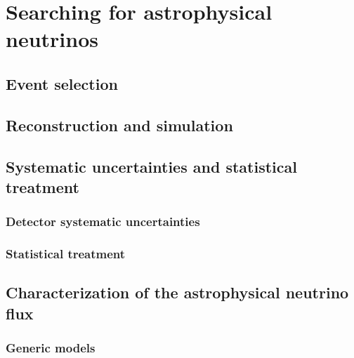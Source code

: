 \chapter{Searching for astrophysical neutrinos}

\section{Event selection\label{sec:selection}}
\begingroup
\graphicspath{{results/HESE_Final_Paper/}}

\endgroup

\section{Reconstruction and simulation}
\begingroup
\graphicspath{{results/HESE_Final_Paper/}}

\endgroup

\section{Systematic uncertainties and statistical treatment\label{sec:uncertainties}}
\subsection{Detector systematic uncertainties\label{sec:detector_systematics}}
\begingroup
\graphicspath{{results/HESE_Final_Paper/}}

\endgroup

\subsection{Statistical treatment\label{sec:statistics}}
\begingroup
\graphicspath{{results/HESE_Final_Paper/}}

\endgroup

\section{Characterization of the astrophysical neutrino flux\label{sec:diffuse}}
\begingroup
\graphicspath{{results/HESE_Final_Paper/}}

\endgroup

\subsection{Generic models\label{sec:generic_models}}
\begingroup
\graphicspath{{results/HESE_Final_Paper/}}

\endgroup

